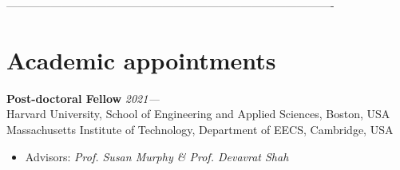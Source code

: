 \documentclass[margin,centered]{res}
\begin{document}
\begin{resume}

----------------------------------------------------------------------------------------
\section{\sc Academic appointments}
{\bf Post-doctoral Fellow}\hspace{10.25cm} \emph{2021---}\\[1mm]
Harvard University, School of Engineering and Applied Sciences, Boston, USA \\[1mm]
Massachusetts Institute of Technology, Department of EECS, Cambridge, USA \\
\begin{itemize}\itemsep0em
\item Advisors: \emph{Prof. Susan Murphy \& Prof. Devavrat Shah}
\end{itemize}
 \vspace{-2mm}



\end{resume}
\end{document}
